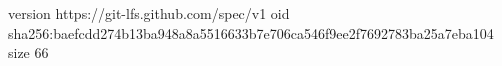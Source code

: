 version https://git-lfs.github.com/spec/v1
oid sha256:baefcdd274b13ba948a8a5516633b7e706ca546f9ee2f7692783ba25a7eba104
size 66
